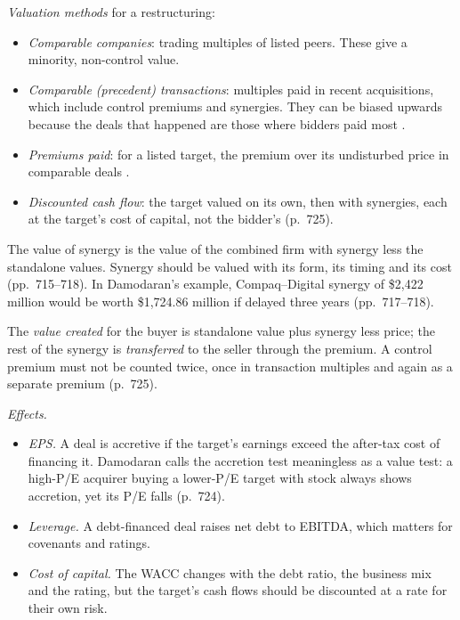 \begin{qfexample}\label{ex:restructuring-valuation-effects}
 \emph{Valuation methods} for a restructuring:
\begin{itemize}
\item \emph{Comparable companies}: trading multiples of listed peers. These give a minority, non-control value.
\item \emph{Comparable (precedent) transactions}: multiples paid in recent acquisitions, which include control premiums and synergies. They can be biased upwards because the deals that happened are those where bidders paid most \citep[p.~725]{investment-valuation-2012}.
\item \emph{Premiums paid}: for a listed target, the premium over its undisturbed price in comparable deals \citep[pp.~702--705]{investment-valuation-2012}.
\item \emph{Discounted cash flow}: the target valued on its own, then with synergies, each at the target's cost of capital, not the bidder's (p.~725).
\end{itemize}
The value of synergy is the value of the combined firm with synergy less the standalone values. Synergy should be valued with its form, its timing and its cost (pp.~715--718). In Damodaran's example, Compaq--Digital synergy of \$2,422 million would be worth \$1,724.86 million if delayed three years (pp.~717--718).

The \emph{value created} for the buyer is standalone value plus synergy less price; the rest of the synergy is \emph{transferred} to the seller through the premium. A control premium must not be counted twice, once in transaction multiples and again as a separate premium (p.~725).

\emph{Effects.}
\begin{itemize}
\item \emph{EPS.} A deal is accretive if the target's earnings exceed the after-tax cost of financing it. Damodaran calls the accretion test meaningless as a value test: a high-P/E acquirer buying a lower-P/E target with stock always shows accretion, yet its P/E falls (p.~724).
\item \emph{Leverage.} A debt-financed deal raises net debt to EBITDA, which matters for covenants and ratings.
\item \emph{Cost of capital.} The WACC changes with the debt ratio, the business mix and the rating, but the target's cash flows should be discounted at a rate for their own risk.
\end{itemize}


\end{qfexample}
